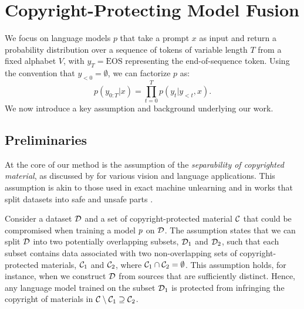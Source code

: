 \section{Copyright-Protecting Model Fusion}

We focus on language models \( p \) that take a prompt \( x \) as input and return a probability distribution over a sequence of tokens of variable length \( T \) from a fixed alphabet \( V \), with \( y_T = \text{EOS} \) representing the end-of-sequence token.  Using
the convention that  \( y_{<0} = \emptyset \), we can factorize $p$ as:
$$
p(y_{0:T} | x) = \prod_{t=0}^T p(y_t | y_{<t}, x).$$
We now introduce a key assumption and background underlying our work.


\subsection{Preliminaries}
\label{sec:preliminaries}
At the core of our method is the assumption of the \textit{separability of copyrighted material}, as discussed by \citet{vyas2023provable} for various vision and language applications. This assumption is akin to those used in exact machine unlearning \citep{bourtoule2021machine,yan2022arcane, dukler2023safe} and in works that split datasets into safe and unsafe parts \citep{golatkar2021mixed, golatkar2024cpr, li2024purifying}.

Consider a dataset $\mathcal D$ and a set of copyright-protected material $\mathcal C$ that could be compromised when training a model $p$ on $\mathcal D$. The assumption states that we can split $\mathcal D$ into two potentially overlapping subsets, $\mathcal D_1$ and $\mathcal D_2$, such that each subset contains data associated with two non-overlapping sets of copyright-protected materials, $\mathcal C_1$ and $\mathcal C_2$, where $\mathcal C_1 \cap \mathcal C_2 = \emptyset$. This assumption holds, for instance, when we construct $\mathcal D$ from sources that are sufficiently distinct. Hence, any language model trained on the subset $\mathcal D_1$ is protected from infringing the copyright of materials in $\mathcal C \setminus \mathcal C_1 \supseteq \mathcal C_2$.

